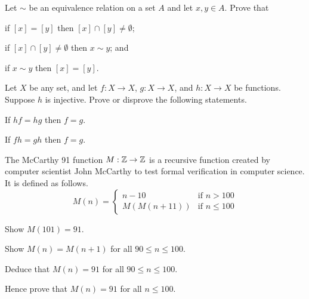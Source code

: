 \begin{problem}\label{problem-equivalence-class-equivalence}
    Let $\sim$ be an equivalence relation on a set $A$ and let $x, y \in A$. Prove that
    \begin{partquestions}{\alph*}
        \item if $[x] = [y]$ then $[x] \cap [y] \neq \emptyset$;
        \item if $[x] \cap [y] \neq \emptyset$ then $x \mathrel{\sim} y$; and
        \item if $x \mathrel{\sim} y$ then $[x] = [y]$.
    \end{partquestions}
\end{problem}

\begin{problem}
    Let $X$ be any set, and let $f: X \to X$, $g: X \to X$, and $h: X \to X$ be functions. Suppose $h$ is injective. Prove or disprove the following statements.
    \begin{partquestions}{\alph*}
        \item If $hf = hg$ then $f = g$.
        \item If $fh = gh$ then $f = g$.
    \end{partquestions}
\end{problem}

\newpage

\begin{problem}
    The McCarthy 91 function $M: \mathbb{Z} \to \mathbb{Z}$ is a recursive function created by computer scientist John McCarthy to test formal verification in computer science. It is defined as follows.
    \[
        M(n) = \begin{cases}
            n - 10 & \text{if } n > 100\\
            M(M(n+11)) & \text{if } n \leq 100
        \end{cases}
    \]
    \begin{partquestions}{\roman*}
        \item Show $M(101) = 91$.
        \item Show $M(n) = M(n+1)$ for all $90 \leq n \leq 100$.
        \item Deduce that $M(n) = 91$ for all $90 \leq n \leq 100$.
        \item Hence prove that $M(n) = 91$ for all $n \leq 100$.
    \end{partquestions}
\end{problem}

